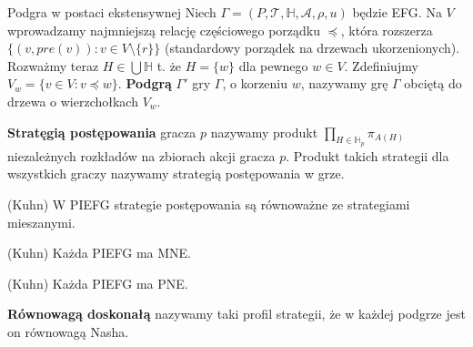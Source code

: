 \begin{definicja}{Podgra w postaci ekstensywnej}
    Niech $\Gamma = (P, \mathcal{T}, \mathbb{H}, \mathcal{A}, \rho, u)$ będzie EFG.
    Na $V$ wprowadzamy najmniejszą relację częściowego porządku $\preceq$, która rozszerza
    $\{(v, pre(v)) : v \in V \setminus \{r\}\}$ (standardowy porządek na drzewach ukorzenionych).
    Rozważmy teraz $H \in \bigcup \mathbb{H}$ t. że $H = \{w\}$ dla pewnego $w \in V$.
    Zdefiniujmy $V_w = \{v \in V : v \preceq w\}$. \textbf{Podgrą} $\Gamma'$ gry $\Gamma$, o korzeniu $w$, nazywamy grę $\Gamma$ obciętą do drzewa o wierzchołkach $V_w$.
\end{definicja}

\begin{definicja}
    \textbf{Stratęgią postępowania} gracza $p$ nazywamy produkt $\prod\limits_{H \in \mathbb{H}_p}\pi_{A(H)}$ niezależnych rozkładów na zbiorach akcji gracza $p$.
    Produkt takich strategii dla wszystkich graczy nazywamy strategią postępowania w grze.
\end{definicja}

\begin{twierdzenie}{(Kuhn)}
    W PIEFG strategie postępowania są równoważne ze strategiami mieszanymi.
\end{twierdzenie}

\begin{twierdzenie}{(Kuhn)}
    Każda PIEFG ma MNE.
\end{twierdzenie}

\begin{twierdzenie}{(Kuhn)}
    Każda PIEFG ma PNE.
\end{twierdzenie}

\begin{definicja}
    \textbf{Równowagą doskonałą} nazywamy taki profil strategii, że w każdej podgrze jest on równowagą Nasha.
\end{definicja}